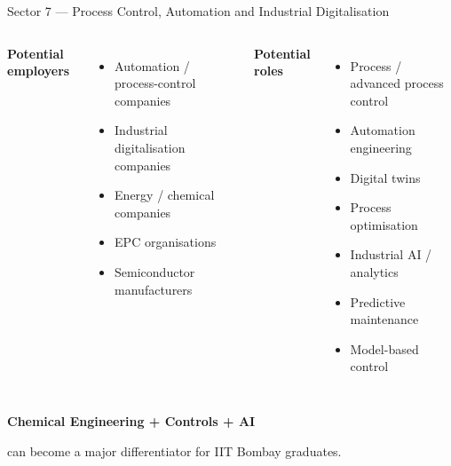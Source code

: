 \documentclass[aspectratio=169,11pt]{beamer}
\newcommand{\key}[1]{\textbf{\color{IITblue}#1}}
\begin{document}
\begin{frame}{Sector 7 — Process Control, Automation and Industrial Digitalisation}
\begin{columns}[T]
\textbf{Potential employers}
\begin{itemize}
\item Automation / process-control companies
\item Industrial digitalisation companies
\item Energy / chemical companies
\item EPC organisations
\item Semiconductor manufacturers
\end{itemize}
\textbf{Potential roles}
\begin{itemize}
\item Process / advanced process control
\item Automation engineering
\item Digital twins
\item Process optimisation
\item Industrial AI / analytics
\item Predictive maintenance
\item Model-based control
\end{itemize}
\end{columns}
\vspace{5mm}
\centering\Large\key{Chemical Engineering + Controls + AI}\par
\vspace{2mm}\normalsize can become a major differentiator for IIT Bombay graduates.
\end{frame}
\end{document}

